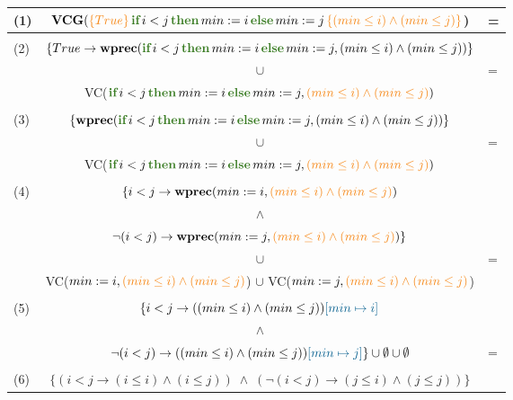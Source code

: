 \documentclass[11pt]{article}
\newcommand{\kw}[1]{{\color{OliveGreen}{#1}}}
\newcommand{\horange}[1]{{\color{BurntOrange}{#1}}}
\newcommand{\hblue}[1]{{\color{MidnightBlue}{#1}}}
\newcommand{\hoaret}[3]{{\color{BurntOrange}{\{#1\}}}\,#2\,{\color{BurntOrange}{\{#3\}}}}
\begin{document}
\begin{tabular}{lcl}
  (1) & $\textbf{VCG}(\hoaret{True}{\textbf{\kw{if}}\,i<j\,\textbf{\kw{then}}\,min := i\,\textbf{\kw{else}}\,min := j}{(min \leq i) \land (min \leq j)}$) & =\\[2ex] \hline\\
  \multirow{3}{*}{(2)} & $\{True \to \textbf{wprec}(\textbf{\kw{if}}\,i<j\,\textbf{\kw{then}}\,min := i\,\textbf{\kw{else}}\,min := j,(min \leq i) \land (min \leq j))\}$ \\
  & \multicolumn{1}{c}{$\cup$} & =\\ 
  & VC($\textbf{\kw{if}}\,i<j\,\textbf{\kw{then}}\,min := i\,\textbf{\kw{else}}\,min := j,\horange{(min \leq i) \land (min \leq j)})$\\[2ex]\hline\\
  \multirow{3}{*}{(3)} & $\{\textbf{wprec}(\textbf{\kw{if}}\,i<j\,\textbf{\kw{then}}\,min := i\,\textbf{\kw{else}}\,min := j,(min \leq i) \land (min \leq j))\}$ \\
  & \multicolumn{1}{c}{$\cup$} & =\\ 
  & VC($\textbf{\kw{if}}\,i<j\,\textbf{\kw{then}}\,min := i\,\textbf{\kw{else}}\,min := j,\horange{(min \leq i) \land (min \leq j)})$\\[2ex]\hline\\
  \multirow{5}{*}{(4)} & $\{i < j \to \textbf{wprec}(min := i,\horange{(min \leq i) \land (min \leq j)})$ \\
  & \multicolumn{1}{c}{$\land$} \\ 
  & $\neg(i < j) \to \textbf{wprec}(min := j,\horange{(min \leq i) \land (min \leq j)})\}$ \\
  & \multicolumn{1}{c}{$\cup$} & =\\
  & VC($min := i,\horange{(min \leq i) \land (min \leq j)}$) $\cup$ VC($min := j,\horange{(min \leq i) \land (min \leq j)}$) \\[2ex]\hline\\
  \multirow{3}{*}{(5)} & $\{i < j \to ((min \leq i) \land (min \leq j))\hblue{[min \mapsto i]}$ \\
  & \multicolumn{1}{c}{$\land$} \\ 
  & $\neg(i < j) \to ((min \leq i) \land (min \leq j))\hblue{[min \mapsto j]}\} \cup \emptyset \cup \emptyset$ & = \\[2ex]\hline\\
  (6) & $\{(i < j \to (i \leq i) \land (i \leq j))\;\land\;(\neg(i < j) \to (j \leq i) \land (j \leq j))\}$
\end{tabular}\vspace{0.5cm}
\end{document}
